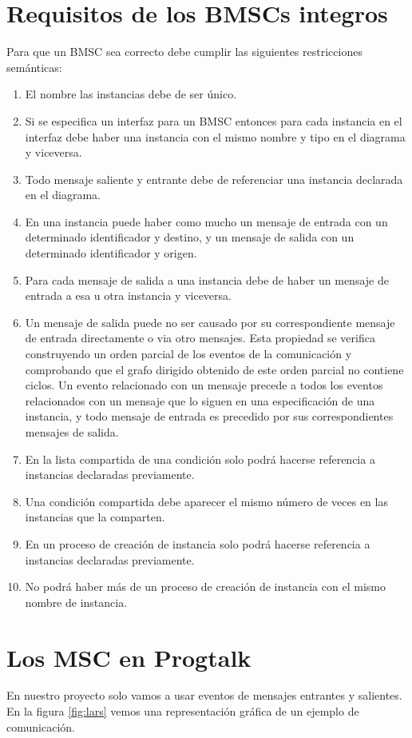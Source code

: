 \section{Requisitos de los BMSCs integros}
Para que un BMSC sea correcto debe cumplir las siguientes
restricciones semánticas:

\begin{enumerate}
\item El nombre las instancias debe de ser único.
\item Si se especifica un interfaz para un BMSC entonces para cada
instancia en el interfaz debe haber una instancia con el mismo 
nombre y tipo en el diagrama y viceversa.
\item Todo mensaje saliente y entrante debe de referenciar una
instancia declarada en el diagrama.
\item En una instancia puede haber como mucho un mensaje de entrada
con un determinado identificador y destino, y un mensaje de salida con
un determinado identificador y origen.
\item Para cada mensaje de salida a una instancia debe de haber un 
mensaje de entrada a esa u otra instancia y viceversa.
\item Un mensaje de salida puede no ser causado por su correspondiente
mensaje de entrada directamente o via otro mensajes.     
Esta propiedad se verifica construyendo un orden parcial de los 
eventos de la comunicación y comprobando que el grafo dirigido 
obtenido de este orden parcial no contiene ciclos. Un evento
relacionado con un mensaje precede a todos los eventos relacionados
con un mensaje que lo siguen en una especificación de una instancia,
y todo mensaje de entrada es precedido por sus correspondientes 
mensajes de salida.
\item En la lista compartida de una condición solo podrá hacerse
referencia a instancias declaradas previamente.
\item Una condición compartida debe aparecer el mismo número de
veces en las instancias que la comparten.
\item En un proceso de creación de instancia solo podrá hacerse
referencia a instancias declaradas previamente.
\item No podrá haber más de un proceso de creación de instancia con
el mismo nombre de instancia.
\end{enumerate}

\section{Los MSC en Progtalk}
En nuestro proyecto solo vamos a usar eventos de mensajes entrantes y
salientes. En la figura \ref{fig:lars} vemos una representación
gráfica de un ejemplo de comunicación.

